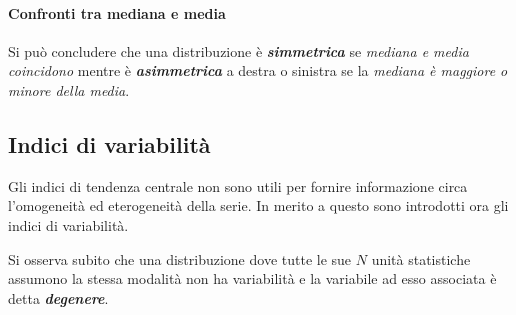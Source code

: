 \documentclass{article}
\begin{document}
    \paragraph{Confronti tra mediana e media}
        Si può concludere che una distribuzione è \textbf{\textit{simmetrica}} se \textit{\textit{mediana e media coincidono}} mentre è \textbf{\textit{asimmetrica}} a destra o sinistra se la \textit{mediana è maggiore o minore della media}.


    
    \subsection{Indici di variabilità}
    Gli indici di tendenza centrale non sono utili per fornire informazione circa l'omogeneità ed eterogeneità della serie. In merito a questo sono introdotti ora gli indici di variabilità. 
    
    
      Si osserva subito che una distribuzione dove tutte le sue $N$ unità statistiche assumono la stessa modalità non ha variabilità e la variabile ad esso associata è detta \textbf{\textit{degenere}}. 
      
\end{document}
